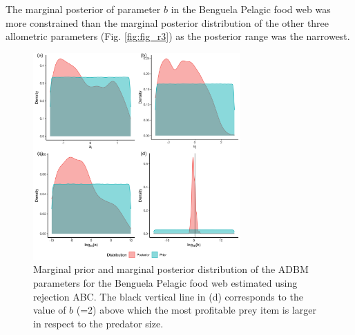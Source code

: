 \documentclass{article}
\begin{document}
The marginal posterior of parameter \(b\) in the Benguela Pelagic food
web was more constrained than the marginal posterior distribution of the
other three allometric parameters (Fig. \ref{fig:fig_r3}) as the
posterior range was the narrowest.

\begin{figure}

{\centering \includegraphics[width=300px]{fig/Benguela_Pelagic_distribution} 

}

\caption{\label{fig:fig_r3} Marginal prior and marginal posterior distribution of the ADBM parameters for the Benguela Pelagic food web estimated using rejection ABC. The black vertical line in (d) corresponds to the value of $b$ (=2) above which the most profitable prey item is larger in respect to the predator size.}\label{fig:unnamed-chunk-6}
\end{figure}
\end{document}
